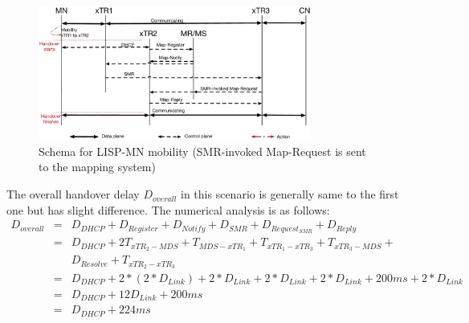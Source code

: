 \begin{figure}[!th]
	\centering
	\includegraphics[width=0.8\textwidth]{Pics/Mobility_xTR_schema_SMR_simplify}
	\caption{Schema for LISP-MN mobility (SMR-invoked Map-Request is sent to the mapping system)}
	\label{sim_schema_xTR}
\end{figure}

The overall handover delay $D_{overall}$ in this scenario is generally same to the first one but has slight difference. The numerical analysis is as follows:
\begin{eqnarray}
D_{overall} &=& D_{DHCP} + D_{Register} + D_{Notify} + D_{SMR} + D_{Request_{SMR}} + D_{Reply} \nonumber \\
&=& D_{DHCP} + 2T_{xTR_2-MDS} + T_{MDS-xTR_1} + T_{xTR_1-xTR_3} + T_{xTR_3-MDS} + \nonumber \\
& & D_{Resolve} + T_{xTR_2-xTR_3} \nonumber \\
&=& D_{DHCP} +2* (2*D_{Link}) + 2*D_{Link} + 2*D_{Link} + 2*D_{Link} + 200ms + 2*D_{Link} \nonumber \\
&=& D_{DHCP} + 12D_{Link} + 200 ms  \\
&=& D_{DHCP} + 224 ms \nonumber
\end{eqnarray}

